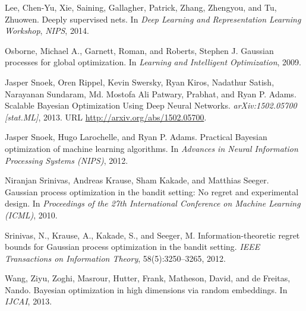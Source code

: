 \documentclass[]{article}
\newcommand{\1}{\mathbf{1}}
\newcommand{\0}{\mathbf{0}}
\begin{document}
\begin{thebibliography}{}
Lee, Chen-Yu, Xie, Saining, Gallagher, Patrick, Zhang, Zhengyou, and Tu, Zhuowen. Deeply supervised nets. In \textit{Deep Learning and Representation Learning Workshop}, \textit{NIPS}, 2014.

Osborne, Michael A., Garnett, Roman, and Roberts, Stephen J. Gaussian processes for global optimization. In \textit{Learning and Intelligent Optimization}, 2009.

Jasper Snoek, Oren Rippel, Kevin Swersky, Ryan Kiros, Nadathur Satish, Narayanan Sundaram, Md. Mostofa Ali Patwary, Prabhat, and Ryan P. Adams. Scalable Bayesian Optimization Using Deep Neural Networks. \textit{arXiv:1502.05700 [stat.ML]}, 2013. URL \url{http://arxiv.org/abs/1502.05700}.

Jasper Snoek, Hugo Larochelle, and Ryan P. Adams. Practical Bayesian optimization of machine learning algorithms. In \textit{Advances in Neural Information Processing Systems (NIPS)}, 2012.

Niranjan Srinivas, Andreas Krause, Sham Kakade, and Matthias Seeger. Gaussian process optimization in the bandit setting: No regret and experimental design. In \textit{Proceedings of the 27th International Conference on Machine Learning (ICML)}, 2010.

Srinivas, N., Krause, A., Kakade, S., and Seeger, M. Information-theoretic regret bounds for Gaussian process optimization in the bandit setting. \textit{IEEE Transactions on Information Theory}, 58(5):3250–3265, 2012.

Wang, Ziyu, Zoghi, Masrour, Hutter, Frank, Matheson, David, and de Freitas, Nando. Bayesian optimization in high dimensions via random embeddings. In \textit{IJCAI}, 2013.

\end{thebibliography}
\endgroup
\end{document}
